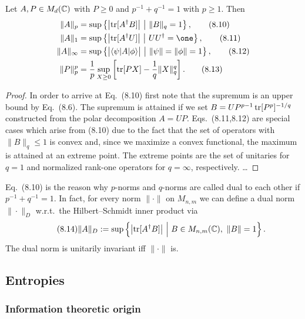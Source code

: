 \documentclass[11pt,a4paper]{article}
\theoremstyle{plain}
\theoremstyle{definition}
\theoremstyle{remark}
\begin{document}
\begin{theorem}
    Let $A,P\in M_d(\mathbb{C})$ with $P\ge 0$ and $p^{-1}+q^{-1}=1$ with $p\ge 1$. Then
    \begin{align}
        \|A\|_p      &= \sup\left\{\bigl|\tr[A^\dagger B]\bigr|\ \big|\ \|B\|_q=1\right\}, \tag{8.10}\\
        \|A\|_1      &= \sup\left\{\bigl|\tr[A^\dagger U]\bigr|\ \big|\ UU^\dagger=\one\right\}, \tag{8.11}\\
        \|A\|_\infty &= \sup\left\{\bigl|\langle\psi|A|\phi\rangle\bigr|\ \big|\ \|\psi\|=\|\phi\|=1\right\}, \tag{8.12}\\
        \|P\|_p^{p}  &= \frac{1}{p}\sup_{X\ge 0}\left[\tr[PX]-\frac{1}{q}\|X\|_q^q\right]. \tag{8.13}
    \end{align}
\end{theorem}

\begin{proof}
    In order to arrive at Eq.~(8.10) first note that the supremum is an upper bound by Eq.~(8.6).
    The supremum is attained if we set $B = UP^{p-1}\operatorname{tr}[P^p]^{-1/q}$ constructed from the polar decomposition
    $A=UP$. Eqs.~(8.11,8.12) are special cases which arise from (8.10) due to the fact that the set of operators
    with $\|B\|_q\le 1$ is convex and, since we maximize a convex functional, the maximum is attained at an extreme point.
    The extreme points are the set of unitaries for $q=1$ and normalized rank-one operators for $q=\infty$, respectively.
    \ldots
\end{proof}

Eq.~(8.10) is the reason why $p$-norms and $q$-norms are called dual to each other if $p^{-1}+q^{-1}=1$.
In fact, for every norm $\|\cdot\|$ on $M_{n,m}$ we can define a dual norm $\|\cdot\|_D$ w.r.t.\ the Hilbert--Schmidt inner product via
\begin{equation}\tag{8.14}
    \|A\|_D := \sup\left\{\bigl|\operatorname{tr}[A^\dagger B]\bigr|\ \Big|\ B\in M_{n,m}(\mathbb{C}),\ \|B\|=1\right\}.
\end{equation}
The dual norm is unitarily invariant iff $\|\cdot\|$ is.

\subsection{Entropies}

\subsubsection{Information theoretic origin}
\end{document}
